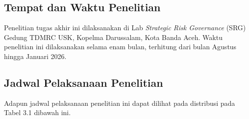 \chapter{\babTiga}
\thispagestyle{fancy}

\section{Tempat dan Waktu Penelitian}
Penelitian tugas akhir ini dilaksanakan di Lab \textit{Strategic Risk Governance} (SRG) Gedung TDMRC USK, Kopelma Darussalam, Kota Banda Aceh. Waktu penelitian ini dilaksanakan selama enam bulan, terhitung dari bulan Agustus hingga Januari 2026.

\section{Jadwal Pelaksanaan Penelitian}
Adapun jadwal pelaksanaan penelitian ini dapat dilihat pada distribusi pada Tabel 3.1 dibawah ini.

